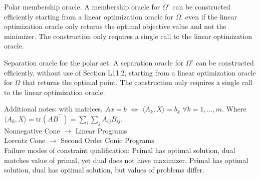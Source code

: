 \begin{theorem}[L11.6]{Polar membership oracle.}
    A membership oracle for $\Omega^{\circ}$ can be constructed efficiently starting from a linear optimization oracle for $\Omega$, even if the linear optimization oracle only returns the optimal objective value and not the minimizer.
    The construction only requires a single call to the linear optimization oracle.
\end{theorem}


\begin{theorem}[L11.7]{Separation oracle for the polar set.}
    A separation oracle for $\Omega^{\circ}$ can be constructed efficiently, without use of Section L11.2, starting from a linear optimization oracle for $\Omega$ that returns the optimal point.
    The construction only requires a single call to the linear optimization oracle.
\end{theorem}

\begin{remark}[X]{Additional notes:}
    with matrices, $Ax=b$ $\Leftrightarrow$ $\langle A_k,X \rangle = b_k$ $\forall k=1,...,m$. Where $\langle A_k,X \rangle = \text{tr}(AB^\top) = \sum_{i}\sum_{j}A_{ij}B_{ij}$.\\

    Nonnegative Cone $\rightarrow$ Linear Programs\\
    Lorentz Cone $\rightarrow$ Second Order Conic Programs\\

    Failure modes of constraint qualification: Primal has optimal solution, dual matches value of primal, yet dual does not have maximizer. Primal has optimal solution, dual has optimal solution, but values of problems differ.
\end{remark}